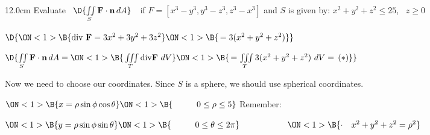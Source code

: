 \begin{frame}
\begin{columns}\begin{column}{12.0cm}
\scriptsize
\EX Evaluate \, $\D{\iint \limits_{S} {\bf F} \cdot {\bf n} \, dA}$	\,\, if $F = [x^3-y^3,y^3-z^3,z^3-x^3]$ and $S$ is given by: $x^2 + y^2 + z^2 \le 25$, \, $z \ge 0$

\vspace{0.1cm}


\vspace{0.2cm}

$\D{
\ON<1>{\B{\text{div } {\bf F} = 3x^2 + 3y^2 + 3z^2}}
\ON<1>{\B{\, = 3(x^2 + y^2 + z^2)}}}$

\vspace{0.2cm}

$\D{\iint \limits_{S} {\bf F} \cdot {\bf n}\, dA = 
\ON<1>{\B{\,\iiint \limits_{T} \text{div} {\bf F} \,\, dV}}
\ON<1>{\B{\,  = \iiint \limits_{T} 3(x^2 + y^2 + z^2) \,\, dV = \, (*)}}
}$

\vspace{0.2cm}

Now we need to choose our coordinates.  Since $S$ is a sphere, we should use spherical coordinates.

\vspace{0.2cm}

$\ON<1>{\B{x = \rho \sin \phi \cos \theta}}
\ON<1>{\B{ \hspace{1.0cm} 0 \le \rho \le 5}} $ \hspace{1.8cm} Remember:
	
\vspace{0.1cm}
	
$\ON<1>{\B{y = \rho \sin \phi \sin \theta}}
\ON<1>{\B{ \hspace{1.0cm} 0 \le \theta \le 2\pi}} \hspace{2.0cm} 
\ON<1>{\B{\cdot \quad x^2+y^2+z^2 = \rho^2}}$	
	
\vspace{0.1cm}
	

\end{column}
\end{columns}
\end{frame}
